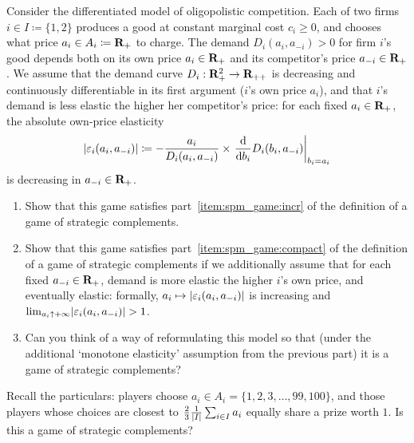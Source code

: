 \begin{exercise}
	\label{exercise:bertrand_spm_diff}
	Consider the differentiated \textcite{Bertrand1883} model of oligopolistic competition.
	Each of two firms $i \in I \coloneqq \{1,2\}$ produces a good at constant marginal cost $c_i \geq 0$, and chooses what price $a_i \in A_i \coloneqq \mathbf{R}_+$ to charge. The demand $D_i(a_i,a_{-i}) > 0$ for firm $i$'s good depends both on its own price $a_i \in \mathbf{R}_+$ and its competitor's price $a_{-i} \in \mathbf{R}_+$. We assume that the demand curve $D_i : \mathbf{R}_+^2 \to \mathbf{R}_{++}$ is decreasing and continuously differentiable in its first argument ($i$'s own price $a_i$), and that $i$'s demand is less elastic the higher her competitor's price: for each fixed $a_i \in \mathbf{R}_+$, the absolute own-price elasticity
	\begin{equation*}
		\abs*{ \eps_i(a_i,a_{-i}) }
		\coloneqq - \frac{a_i}{D_i(a_i,a_{-i})}
		\times
		\left. \frac{\dd}{\dd b_i} D_i(b_i,a_{-i}) \right|_{b_i = a_i}
	\end{equation*}
	is decreasing in $a_{-i} \in \mathbf{R}_+$.

	\begin{enumerate}[label=(\alph*)]
	
		\item Show that this game satisfies part~\ref{item:spm_game:incr} of the definition of a game of strategic complements.

		\item Show that this game satisfies part~\ref{item:spm_game:compact} of the definition of a game of strategic complements if we additionally assume that for each fixed $a_{-i} \in \mathbf{R}_+$, demand is more elastic the higher $i$'s own price, and eventually elastic: formally, $a_i \mapsto \abs*{ \eps_i(a_i,a_{-i}) }$ is increasing and $\lim_{a_i \uparrow +\infty} \abs*{ \eps_i(a_i,a_{-i}) } > 1$.

		\item Can you think of a way of reformulating this model so that (under the additional `monotone elasticity' assumption from the previous part) it is a game of strategic complements?
	
	\end{enumerate}
\end{exercise}

\begin{namedthm}
	\label{exercise:nagel_spm}
	Recall the particulars: players choose $a_i \in A_i = \{1,2,3,\dots,99,100\}$, and those players whose choices are closest to $\frac{2}{3} \frac{1}{\abs*{I}} \sum_{i \in I} a_i$ equally share a prize worth $1$. Is this a game of strategic complements?
\end{namedthm}

